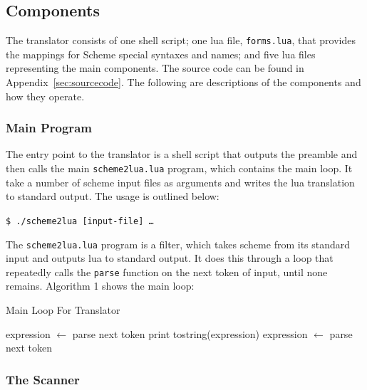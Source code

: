 \subsection{Components}

The translator consists of one shell script; one lua file, \texttt{forms.lua},
that provides the mappings for Scheme special syntaxes and names; and five lua
files representing the main components. The source code can be found in
Appendix~\ref{sec:sourcecode}. The following are descriptions of the components
and how they operate.

\subsubsection{Main Program}

The entry point to the translator is a shell script that outputs the preamble
and then calls the main \texttt{scheme2lua.lua} program, which contains the main
loop. It take a number of scheme input files as arguments and writes the lua
translation to standard output. The usage is outlined below:

\begin{framed}
\texttt{\$ ./scheme2lua [input-file] \ldots}
\end{framed}

The \texttt{scheme2lua.lua} program is a filter, which takes scheme from its
standard input and outputs lua to standard output. It does this through a loop
that repeatedly calls the \texttt{parse} function on the next token of input,
until none remains. Algorithm 1 shows the main loop:

\begin{algorithm}
\caption{Main Loop For Translator}
\label{alg:mainloop}
\begin{algorithmic}
\STATE expression $\leftarrow$ parse next token  
\STATE print tostring(expression)
\STATE expression $\leftarrow$ parse next token
\ENDWHILE
\end{algorithmic}
\end{algorithm}

\subsubsection{The Scanner}

